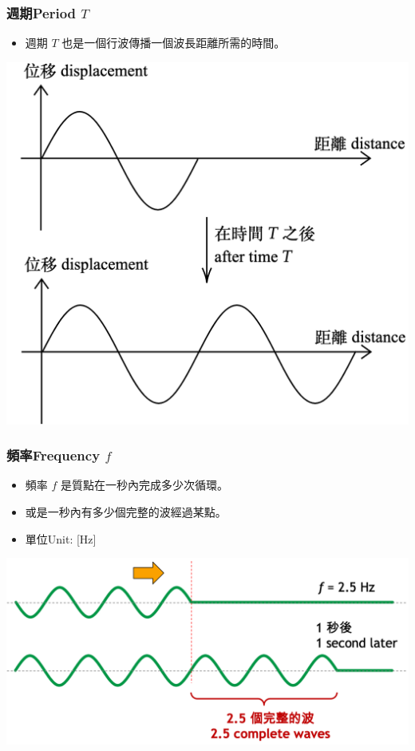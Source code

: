 \documentclass[beamer=true]{standalone}
\begin{document}
\begin{frame}
    \frametitle{週期Period $T$}

    \begin{itemize}
        \item 週期 $T$ 也是一個行波傳播一個波長距離所需的時間。
    \end{itemize}
    \par{\par\centering\includegraphics[width=.6\textwidth]{./img/ch1_2024-05-07-18-16-42.png}\par}
\end{frame}

\begin{frame}
    \frametitle{頻率Frequency $f$}
    \begin{itemize}
        \item 頻率 $f$ 是質點在一秒內完成多少次循環。
        \item 或是一秒內有多少個完整的波經過某點。
        \item 單位Unit: [Hz]
    \end{itemize}
    \par{\par\centering\includegraphics[width=.75\textwidth]{./img/ch1_2024-05-08-15-21-40.png}\par}
\end{frame}
\end{document}
